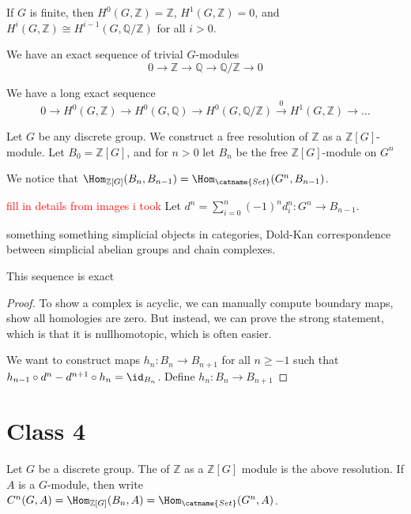 \documentclass[12pt]{scrartcl}
\begin{document}
		\begin{corollary}
			If $G$ is finite, then $H^0(G, \mathbb{Z}) = \mathbb{Z}$, $H^1(G, \mathbb{Z}) = 0$, and $H^i(G, \mathbb{Z}) \cong H^{i-1}(G, \mathbb{Q}/\mathbb{Z})$ for all $i>0$.   
		\end{corollary}

		\begin{proposition}
		We have an exact sequence of trivial $G$-modules
		\[
		0 \to \mathbb{Z} \to \mathbb{Q}\to \mathbb{Q}/\mathbb{Z} \to 0
		\] 
		\end{proposition}

		\begin{corollary}
		We have a long exact sequence
		\[
			0 \to H^0(G, \mathbb{Z}) \to H^0(G, \mathbb{Q}) \to H^0(G, \mathbb{Q}/\mathbb{Z}) \xrightarrow{0} H^1(G, \mathbb{Z}) \to \dots
		\] 
		\end{corollary}

		Let $G$ be any discrete group.
		We construct a free resolution of $\mathbb{Z}$ as a $\mathbb{Z}[G]$-module.
		Let $B_0 = \mathbb{Z}[G]$, and for $n>0$ let $B_n$ be the free $\mathbb{Z}[G]$-module on $G^n$   

		We notice that $\Hom_{\mathbb{Z}[G]}(B_n, B_{n-1}) = \Hom_{\catname{Set}}(G^n, B_{n-1})$.

		\textcolor{red}{fill in details from images i took}
		Let $d^n = \sum_{i=0}^n (-1)^{n} d_i^n: G^n \to B_{n-1}$. 
		
something something simplicial objects in categories, Dold-Kan correspondence between simplicial abelian groups and chain complexes.

		\begin{theorem}
		This sequence is exact
		\end{theorem}
		\begin{proof}
		
		
To show a complex is acyclic, we can manually compute boundary maps, show all homologies are zero.
But instead, we can prove the strong statement, which is that it is nullhomotopic, which is often easier.

We want to construct maps $h_n: B_n \to B_{n+1}$ for all $n \geq -1$ such that $h_{n-1} \circ d^n - d^{n+1} \circ h_n = \id_{B_n}$.
Define $h_n: B_n \to B_{n+1}$ 
		\end{proof}

		\section{Class 4}
Let $G$ be a discrete group.
The  of $\mathbb{Z}$ as a $\mathbb{Z}[G]$ module is the above resolution.
If $A$ is a $G$-module, then write $C^n(G, A) = \Hom_{\mathbb{Z}[G]}(B_n, A) = \Hom_{\catname{Set} }(G^n, A)$.
\end{document}
